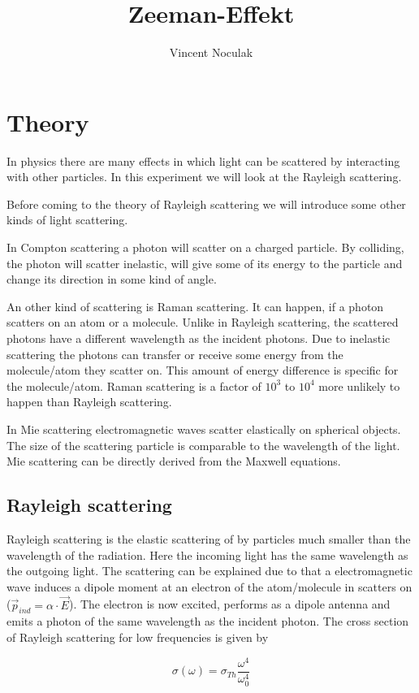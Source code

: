 \documentclass[12pt,a4paper]{article}
\author{Vincent Noculak}
\title{Zeeman-Effekt}
\begin{document}
\newpage

\section{Theory}

In physics there are many effects in which light can be scattered by interacting with other particles. In this experiment we will look at the Rayleigh scattering.

Before coming to the theory of Rayleigh scattering we will introduce some other kinds of light scattering.

In Compton scattering a photon will scatter on a charged particle. By colliding, the photon will scatter inelastic, will give some of its energy to the particle and change its direction in some kind of angle.

An other kind of scattering is Raman scattering. It can happen, if a photon scatters on an atom or a molecule. Unlike in Rayleigh scattering, the scattered photons have a different wavelength as the incident photons. Due to inelastic scattering the photons can transfer or receive some energy from the molecule/atom they scatter on. This amount of energy difference is specific for the molecule/atom. Raman scattering is a factor of $10^3$ to $10^4$ more unlikely to happen than Rayleigh scattering.

In Mie scattering electromagnetic waves scatter elastically on spherical objects. The size of the scattering particle is comparable to the wavelength of the light. Mie scattering can be directly derived from the Maxwell equations.

\subsection{Rayleigh scattering}

Rayleigh scattering is the elastic scattering of by particles much smaller than the wavelength of the radiation. Here the incoming light has the same wavelength as the outgoing light.
The scattering can be explained due to that a electromagnetic wave induces a dipole moment at an electron of the atom/molecule in scatters on ($\vec{p}_{ind} = \alpha \cdot \vec{E}$). The electron is now excited, performs as a dipole antenna and emits a photon of the same wavelength as the incident photon.
The cross section of Rayleigh scattering for low frequencies is given by

\begin{equation}
\sigma(\omega) = \sigma_{Th} \frac{\omega^4}{\omega_0^4}
\end{equation}
\end{document}
